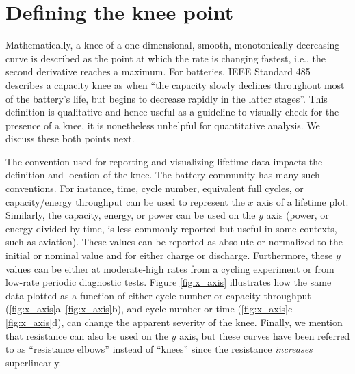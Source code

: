 \documentclass[journal=jpclcd,manuscript=article]{achemso}
\newcommand{\cmark}{\textcolor{blue}{\textrm{\ding{52}}}}%
\newcommand{\pbox}[1]{{
\fbox{
\parbox{0.8\textwidth}{  \fbox{$\triangleright$\textcolor{blue}{\textbf{Peter}:}} 
#1
}}}}
\begin{document}
\section{Defining the knee point}
\label{sec:defining-knee-points}

Mathematically, a knee of a one-dimensional, smooth, monotonically decreasing curve is described as the point at which the rate is changing fastest, i.e., the second derivative reaches a maximum. For batteries, IEEE Standard 485 describes a capacity knee as when ``the capacity slowly declines throughout
most of the battery’s life, but begins to decrease rapidly in the latter stages''\cite{ieee_power_and_energy_society_ieee_2020}. 
This definition is qualitative and hence useful as a guideline to visually check for the presence of a knee, it is nonetheless unhelpful for quantitative analysis. We discuss these both points next.


The convention used for reporting and visualizing lifetime data impacts the definition and location of the knee. The battery community has many such conventions. For instance, time, cycle number, equivalent full cycles, or capacity/energy throughput can be used to represent the $x$ axis of a lifetime plot. Similarly, the capacity, energy, or power can be used on the $y$ axis (power, or energy divided by time, is less commonly reported but useful in some contexts, such as aviation). These values can be reported as absolute or normalized to the initial or nominal value and for either charge or discharge. Furthermore, these $y$ values can be either at moderate-high rates from a cycling experiment or from low-rate periodic diagnostic tests. Figure \ref{fig:x_axis} illustrates how the same data plotted as a function of either cycle number or capacity throughput (\ref{fig:x_axis}a--\ref{fig:x_axis}b), and cycle number or time (\ref{fig:x_axis}c--\ref{fig:x_axis}d), can change the apparent severity of the knee.
Finally, we mention that resistance can also be used on the $y$ axis, but these curves have been referred to as ``resistance elbows'' instead of ``knees'' since the resistance \textit{increases} superlinearly.\cite{strange_elbows_2021}
\end{document}
